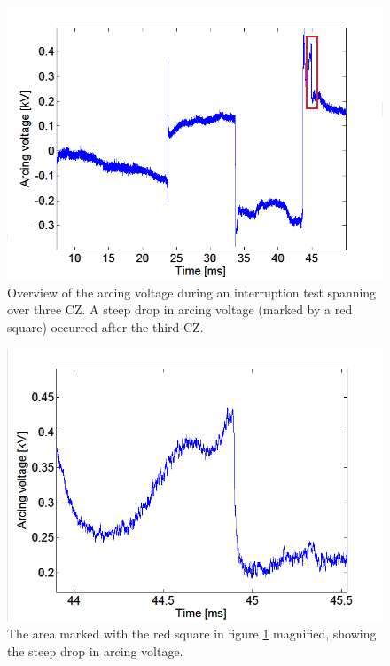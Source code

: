 \documentclass[10pt,b5paper,twoside]{article}
\begin{document}
 

\begin{figure}[H]
\centering
\includegraphics[scale=0.6, angle =0 ]{Bilder/Results/overviewArcingVoltageDrop.PNG}
\caption{Overview of the arcing voltage during an interruption test spanning over three CZ. A steep drop in arcing voltage (marked by a red square) occurred after the third CZ.} \label{fig:arcingVoltageDrop}
\end{figure}

\begin{figure}[H]
\centering
\includegraphics[scale=0.6, angle =0 ]{Bilder/Results/zoomArcingVoltageDrop.PNG}
\caption{The area marked with the red square in figure \ref{fig:arcingVoltageDrop} magnified, showing the steep drop in arcing voltage.} \label{fig:arcingVoltageDrop_zoomed}
\end{figure}
\end{document}
